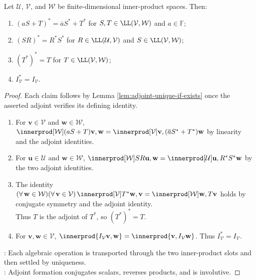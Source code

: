 \begin{proposition} \label{prop:basic-adjoint-identities} \\
Let $\mathcal{U}$, $\mathcal{V}$, and $\mathcal{W}$ be finite-dimensional inner-product spaces. Then:
\begin{enumerate}[label=(\roman*)]
\setlength{\itemsep}{0pt}
\item $(aS+T)^*=\overline{a}S^*+T^*$ for $S,T\in\LL(\mathcal{V},\mathcal{W})$ and $a\in\mathbb{F}$;
\item $(SR)^*=R^*S^*$ for $R\in\LL(\mathcal{U},\mathcal{V})$ and $S\in\LL(\mathcal{V},\mathcal{W})$;
\item $(T^*)^*=T$ for $T\in\LL(\mathcal{V},\mathcal{W})$;
\item $I_{\mathcal{V}}^*=I_{\mathcal{V}}$.
\end{enumerate}
\begin{proof}
Each claim follows by Lemma \ref{lem:adjoint-unique-if-exists} once the asserted adjoint verifies its defining identity.
\begin{enumerate}[label=(\roman*)]
\setlength{\itemsep}{0pt}
\item For $\mathbf{v}\in\mathcal{V}$ and $\mathbf{w}\in\mathcal{W}$, $\innerprod[\mathcal{W}]{(aS+T)\mathbf{v},\mathbf{w}}=\innerprod[\mathcal{V}]{\mathbf{v},(\overline{a}S^*+T^*)\mathbf{w}}$ by linearity and the adjoint identities.
\item For $\mathbf{u}\in\mathcal{U}$ and $\mathbf{w}\in\mathcal{W}$, $\innerprod[\mathcal{W}]{SR\mathbf{u},\mathbf{w}}=\innerprod[\mathcal{U}]{\mathbf{u},R^*S^*\mathbf{w}}$ by the two adjoint identities.
\item The identity $(\forall\,\mathbf{w}\in\mathcal{W})(\forall\,\mathbf{v}\in\mathcal{V})\,\innerprod[\mathcal{V}]{T^*\mathbf{w},\mathbf{v}}=\innerprod[\mathcal{W}]{\mathbf{w},T\mathbf{v}}$ holds by conjugate symmetry and the adjoint identity.\\
Thus $T$ is the adjoint of $T^*$, so $(T^*)^*=T$.
\item For $\mathbf{v},\mathbf{w}\in\mathcal{V}$, $\innerprod{I_{\mathcal{V}}\mathbf{v},\mathbf{w}}=\innerprod{\mathbf{v},I_{\mathcal{V}}\mathbf{w}}$. Thus $I_{\mathcal{V}}^*=I_{\mathcal{V}}$.
\end{enumerate}
: Each algebraic operation is transported through the two inner-product slots and then settled by uniqueness.\\
: Adjoint formation conjugates scalars, reverses products, and is involutive.
\end{proof}
\end{proposition}

